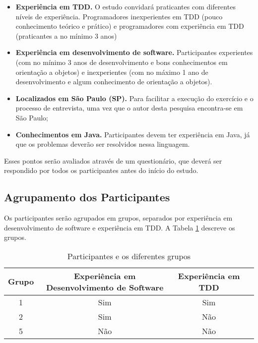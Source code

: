 \begin{itemize}
	\item \textbf{Experiência em TDD.} O estudo convidará praticantes com diferentes
	níveis de experiência. Programadores inexperientes em TDD (pouco conhecimento teórico e prático)
	e programadores com experiência em TDD (praticantes a no mínimo 3 anos)
	
	\item \textbf{Experiência em desenvolvimento de software.} Participantes
	experientes (com no mínimo 3 anos de desenvolvimento e bons conhecimentos em orientação a objetos) e 
	inexperientes (com no máximo 1 ano de desenvolvimento e algum conhecimento de orientação a objetos).

	\item \textbf{Localizados em São Paulo (SP).} Para facilitar a execução do exercício
	e o processo de entrevista, uma vez que o autor desta pesquisa encontra-se em São Paulo;

	\item \textbf{Conhecimentos em Java.} 
	Participantes devem ter experiência em Java, já que os problemas deverão ser resolvidos
	nessa linguagem.	
\end{itemize}

Esses pontos serão avaliados através de um questionário, que deverá ser
respondido por todos os participantes antes do início do estudo.

\subsection{Agrupamento dos Participantes}

Os participantes serão agrupados em grupos, separados por experiência em desenvolvimento
de software e experiência em TDD. A Tabela 
\ref{tab:participantes-e-grupos} descreve os grupos.

\begin{table}[h!]
	\caption{Participantes e os diferentes grupos}
	\begin{tabular}{| c | c | c | c |}
		\hline
		Grupo & Experiência em Desenvolvimento de Software & Experiência em TDD \\ 	\hline
		1 & Sim & Sim \\ 	\hline
		2 & Sim & Não \\ 	\hline
		5 & Não & Não \\ 	\hline
	\end{tabular}
	\label{tab:participantes-e-grupos}
\end{table}


